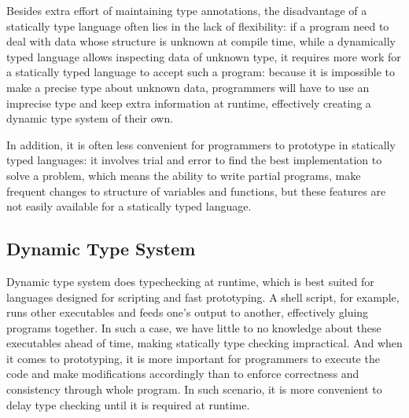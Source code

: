 Besides extra effort of maintaining type annotations,
the disadvantage of a statically type language often lies in the lack of flexibility:
if a program need to deal with data whose structure is unknown at compile time,
while a dynamically typed language allows inspecting data of unknown type,
it requires more work for a statically typed language to accept such a program:
because it is impossible to make a precise type about unknown data,
programmers will have to use an imprecise type
and keep extra information at runtime,
effectively creating a dynamic type system of their own.

In addition, it is often less convenient for programmers to prototype
in statically typed languages: it involves trial and error to find the best implementation
to solve a problem, which means the ability to write partial programs,
make frequent changes to structure of variables and functions, but these features are not easily available for a statically typed language.


\subsection{Dynamic Type System}

Dynamic type system does typechecking at runtime, which is best suited for
languages designed for scripting and fast prototyping.
A shell script, for example, runs other executables and feeds one's output to another, effectively gluing programs together.
In such a case, we have little to no knowledge about these executables ahead of time,
making statically type checking impractical.
And when it comes to prototyping,
it is more important for programmers to execute the code and make modifications accordingly
than to enforce correctness and consistency through whole program.
In such scenario, it is more convenient to delay type checking until
it is required at runtime.


